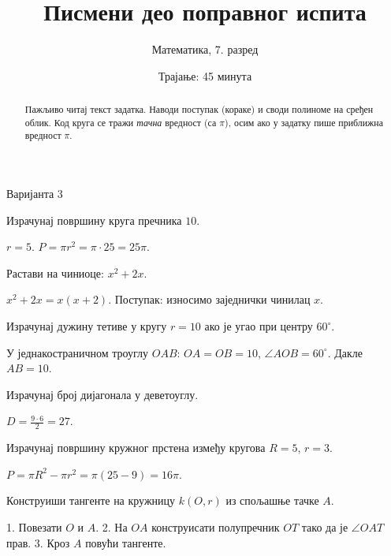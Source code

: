 \documentclass[11pt,a5paper,twoside,addpoints,noanswers]{exam}
\title{Писмени део поправног испита}
\author{Математика, 7. разред}
\date{Трајање: 45 минута}
\newcommand{\variant}[1]{#1}
\begin{document}
\maketitle

\ifprintanswers\else
\begin{flushleft}\scriptsize
\gradetable[h]
\end{flushleft}
\begin{abstract}\small
Пажљиво читај текст задатка. Наводи поступак (кораке) и своди полиноме на сређен облик.  
Код круга се тражи \emph{тачна} вредност (са $\pi$), осим ако у задатку пише приближна вредност $\pi$.
\end{abstract}
\fi

\ifprintanswers\else
\newpage
\fi

\variant{Варијанта 3}

\begin{questions}

\question[4] Израчунај површину круга пречника $10$.
\begin{solution}[\stretch{2}]
$r=5$. $P=\pi r^2=\pi\cdot 25=25\pi$.  
\end{solution}

\question[3] Растави на чиниоце: $x^2+2x$.
\begin{solution}[\stretch{2}]
$x^2+2x=x(x+2)$.  
Поступак: износимо заједнички чинилац $x$.  
\end{solution}

\question[4] Израчунај дужину тетиве у кругу $r=10$ ако је угао при центру $60^\circ$.
\begin{solution}[\stretch{3}]
У једнакостраничном троуглу $OAB$: $OA=OB=10$, $\angle AOB=60^\circ$.  
Дакле $AB=10$.  
\end{solution}

\question[3] Израчунај број дијагонала у деветоуглу.
\begin{solution}[\stretch{2}]
$D=\tfrac{9\cdot 6}2=27$.  
\end{solution}

\question[4] Израчунај површину кружног прстена између кругова $R=5$, $r=3$.
\begin{solution}[\stretch{3}]
$P=\pi R^2-\pi r^2=\pi(25-9)=16\pi$.  
\end{solution}

\question[4] Конструиши тангенте на кружницу $k(O,r)$ из спољашње тачке $A$.
\begin{solution}[\stretch{4}]
1. Повезати $O$ и $A$.  
2. На $OA$ конструисати полупречник $OT$ тако да је $\angle OAT$ прав.  
3. Кроз $A$ повући тангенте.  
\end{solution}

\end{questions}
\end{document}
